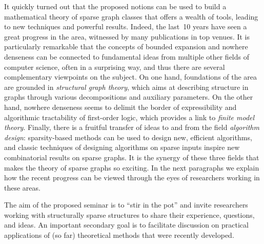It quickly turned out that the proposed notions can be used to build a mathematical theory of sparse graph classes that offers a wealth of tools, leading to new techniques and powerful results.
Indeed, the last~10 years have seen a great progress in the area, witnessed by many publications in top venues.
It is particularly remarkable that the concepts of bounded expansion and nowhere denseness can be connected
to fundamental ideas from multiple other fields of computer science, often in a surprising way, and thus there are several complementary viewpoints on the subject.
On one hand, foundations of the area are grounded in {\em{structural graph theory}}, which aims at describing structure in graphs through various decompositions and auxiliary parameters.
On the other hand, nowhere denseness seems to delimit the border of expressibility and algorithmic tractability of first-order logic, which provides a link to {\em{finite model theory}}.
Finally, there is a fruitful transfer of ideas to and from the field {\em{algorithm design}}: sparsity-based methods can be used to design new, efficient algorithms,
and classic techniques of designing algorithms on sparse inputs inspire new combinatorial results on sparse graphs.
It is the synergy of these three fields that makes the theory of sparse graphs so exciting.
In the next paragraphs we explain how the recent progress can be viewed through the eyes of researchers working in these areas.

The aim of the proposed seminar is to ``stir in the pot'' and invite researchers working with structurally sparse structures to share their experience, questions, and ideas.
An important secondary goal is to facilitate discussion on practical applications of (so far) theoretical methods that were recently developed.
